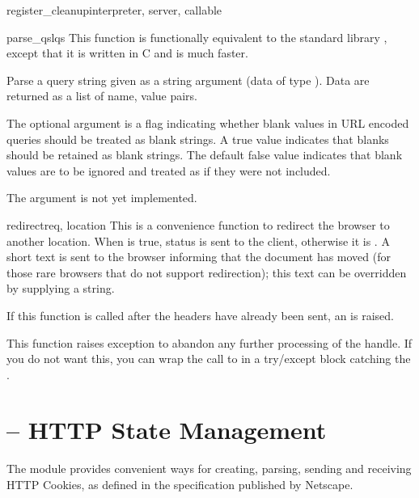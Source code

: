 \begin{funcdesc}{register_cleanup}{interpreter, server, callable}
\begin{funcdesc}{parse_qsl}{qs}
  This function is functionally equivalent to the standard library
   , except that it is written in C and is
  much faster. 

  Parse a query string given as a string argument (data of type
  ).  Data are
  returned as a list of name, value pairs.

  The optional argument  is a flag indicating
  whether blank values in URL encoded queries should be treated as blank
  strings.  A true value indicates that blanks should be retained as
  blank strings.  The default false value indicates that blank values
  are to be ignored and treated as if they were not included.

  \begin{notice}
    The  argument is not yet implemented.
  \end{notice}

\end{funcdesc}

\begin{funcdesc}{redirect}{req, location}
  This is a convenience function to redirect the browser to another
  location. When  is true, 
  status is sent to the client, otherwise it is
  . A short text is sent to the browser
  informing that the document has moved (for those rare browsers that
  do not support redirection); this text can be overridden by
  supplying a  string.

  If this function is called after the headers have already been sent,
  an  is raised.

  This function raises  exception to
  abandon any further processing of the handle. If you do not want
  this, you can wrap the call to  in a try/except
  block catching the .
\end{funcdesc}

\section{ -- HTTP State Management\label{pyapi-cookie}}

The  module provides convenient ways for creating,
parsing, sending and receiving HTTP Cookies, as defined in the
specification published by Netscape.


\end{funcdesc}
